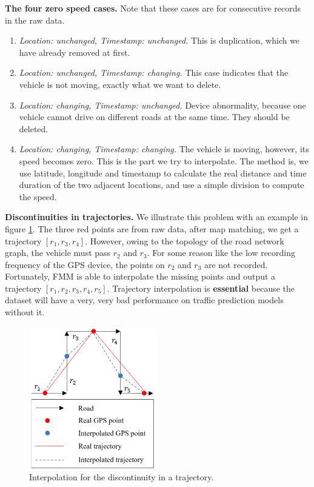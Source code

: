 \vspace{\baselineskip}

\textbf{The four zero speed cases.} Note that these cases are for consecutive records in the raw data.
\begin{enumerate}
  \item \textit{Location: unchanged, Timestamp: unchanged.} This is duplication, which we have already removed at first.
  \item \textit{Location: unchanged, Timestamp: changing.} This case indicates that the vehicle is not moving, exactly what we want to delete.
  \item \textit{Location: changing, Timestamp: unchanged.} Device abnormality, because one vehicle cannot drive on different roads at the same time. They should be deleted.
  \item \textit{Location: changing, Timestamp: changing.} The vehicle is moving, however, its speed becomes zero. This is the part we try to interpolate. The method is, we use latitude, longitude and timestamp to calculate the real distance and time duration of the two adjacent locations, and use a simple division to compute the speed.
\end{enumerate}

\vspace{\baselineskip}

\textbf{Discontinuities in trajectories.} We illustrate this problem with an example in figure \ref{fig: traj_interpolate}. The three red points are from raw data, after map matching, we get a trajectory $[r_1, r_3, r_4]$. However, owing to the topology of the road network graph, the vehicle must pass $r_2$ and $r_3$. For some reason like the low recording frequency of the GPS device, the points on $r_2$ and $r_3$ are not recorded. Fortunately, FMM is able to interpolate the missing points and output a trajectory $[r_1, r_2, r_3, r_4, r_5]$. Trajectory interpolation is \textbf{essential} because the dataset will have a very, very bad performance on traffic prediction models without it.

\begin{figure}[htb]
  \centering
  \includegraphics[width=0.5\textwidth]{images/traj_interpolate.png}
  \caption{Interpolation for the discontinuity in a trajectory.}
  \label{fig: traj_interpolate}
\end{figure}

